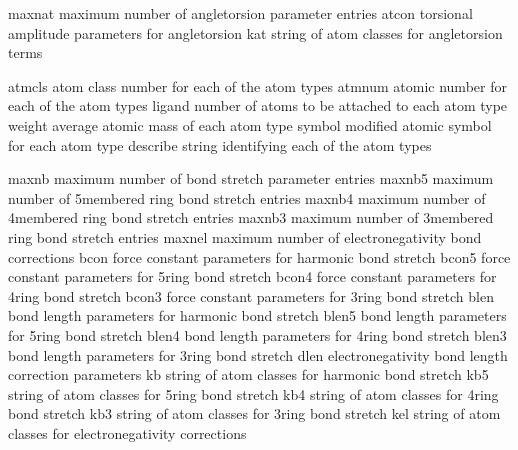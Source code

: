 \documentclass[letterpaper,11pt,english]{sphinxmanual}
\begin{document}

\begin{sphinxVerbatim}[commandchars=\\\{\}]
maxnat          maximum number of angle\PYGZhy{}torsion parameter entries
atcon           torsional amplitude parameters for angle\PYGZhy{}torsion
kat             string of atom classes for angle\PYGZhy{}torsion terms
\end{sphinxVerbatim}


\begin{sphinxVerbatim}[commandchars=\\\{\}]
atmcls          atom class number for each of the atom types
atmnum          atomic number for each of the atom types
ligand          number of atoms to be attached to each atom type
weight          average atomic mass of each atom type
symbol          modified atomic symbol for each atom type
describe        string identifying each of the atom types
\end{sphinxVerbatim}


\begin{sphinxVerbatim}[commandchars=\\\{\}]
maxnb           maximum number of bond stretch parameter entries
maxnb5          maximum number of 5\PYGZhy{}membered ring bond stretch entries
maxnb4          maximum number of 4\PYGZhy{}membered ring bond stretch entries
maxnb3          maximum number of 3\PYGZhy{}membered ring bond stretch entries
maxnel          maximum number of electronegativity bond corrections
bcon            force constant parameters for harmonic bond stretch
bcon5           force constant parameters for 5\PYGZhy{}ring bond stretch
bcon4           force constant parameters for 4\PYGZhy{}ring bond stretch
bcon3           force constant parameters for 3\PYGZhy{}ring bond stretch
blen            bond length parameters for harmonic bond stretch
blen5           bond length parameters for 5\PYGZhy{}ring bond stretch
blen4           bond length parameters for 4\PYGZhy{}ring bond stretch
blen3           bond length parameters for 3\PYGZhy{}ring bond stretch
dlen            electronegativity bond length correction parameters
kb              string of atom classes for harmonic bond stretch
kb5             string of atom classes for 5\PYGZhy{}ring bond stretch
kb4             string of atom classes for 4\PYGZhy{}ring bond stretch
kb3             string of atom classes for 3\PYGZhy{}ring bond stretch
kel             string of atom classes for electronegativity corrections
\end{sphinxVerbatim}
\end{document}
